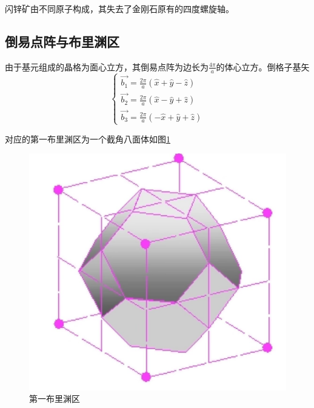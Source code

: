 \documentclass{article}
\begin{document}
	
	
	
	
	闪锌矿由不同原子构成，其失去了金刚石原有的四度螺旋轴。
	
	\subsection{倒易点阵与布里渊区}
	由于基元组成的晶格为面心立方，其倒易点阵为边长为$ \frac{4\pi}{a} $的体心立方。倒格子基矢
	\begin{equation}
		\begin{cases}
			\vec{b_1}=\frac{2\pi}{a}(\hat{x}+\hat{y}-\hat{z})\\
			\vec{b_2}=\frac{2\pi}{a}(\hat{x}-\hat{y}+\hat{z})\\
			\vec{b_3}=\frac{2\pi}{a}(-\hat{x}+\hat{y}+\hat{z})
		\end{cases}
	\end{equation}
	
	
	对应的第一布里渊区为一个截角八面体如图\ref{fig:4}
	\begin{figure}[!h]
		
		\centering
		\includegraphics[scale=0.2]{布里渊区}
		\caption{\heiti{}第一布里渊区}
		\label{fig:4}
	\end{figure}
	
\end{document}
